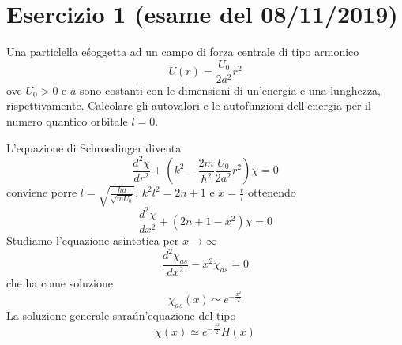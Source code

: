 \documentclass[a4paper]{article}
\begin{document}
    \section*{Esercizio 1 (esame del 08/11/2019)}
        Una particlella e\' soggetta ad un campo di forza centrale di tipo armonico
        \begin{equation*}
            U(r)=\frac{U_0}{2a^2}r^2
        \end{equation*}
        ove $U_0 > 0$ e $a$ sono costanti con le dimensioni di un'energia e una lunghezza, rispettivamente.
        Calcolare gli autovalori e le autofunzioni dell'energia per il numero quantico orbitale $l = 0$.
        \begin{figure}[H]
            \centering
        \end{figure}
        L'equazione di Schroedinger diventa
        \begin{equation*}
            \frac{d^2\chi}{dr^2}+\left(k^2-\frac{2m}{\hbar^2}\frac{U_0}{2a^2}r^2\right)\chi=0
        \end{equation*}
        conviene porre $l=\sqrt{\frac{\hbar a}{\sqrt{mU_0}}}$, $k^2l^2=2n+1$ e $x=\frac{r}{l}$ ottenendo
        \begin{equation*}
            \frac{d^2\chi}{dx^2}+(2n+1-x^2)\chi=0
        \end{equation*}
        Studiamo l'equazione asintotica per $x\to\infty$
        \begin{equation*}
            \frac{d^2\chi_{as}}{dx^2}-x^2\chi_{as}=0
        \end{equation*}
        che ha come soluzione
        \begin{equation*}
            \chi_{as}(x)\simeq e^{-\frac{x^2}{2}}
        \end{equation*}
        La soluzione generale sara\' un'equazione del tipo
        \begin{equation*}
            \chi(x)\simeq e^{-\frac{x^2}{2}}H(x)
        \end{equation*}
\end{document}
